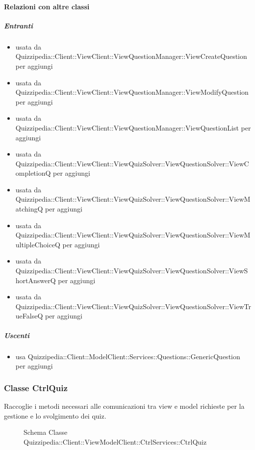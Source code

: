 \paragraph{Relazioni con altre classi}
\subparagraph{Entranti}
\begin{itemize}
\item usata da Quizzipedia::Client::ViewClient::ViewQuestionManager::ViewCreateQuestion per aggiungi
\item usata da Quizzipedia::Client::ViewClient::ViewQuestionManager::ViewModifyQuestion per aggiungi
\item usata da Quizzipedia::Client::ViewClient::ViewQuestionManager::ViewQuestionList per aggiungi
\item usata da Quizzipedia::Client::ViewClient::ViewQuizSolver::ViewQuestionSolver::ViewCompletionQ per aggiungi
\item usata da Quizzipedia::Client::ViewClient::ViewQuizSolver::ViewQuestionSolver::ViewMatchingQ per aggiungi
\item usata da Quizzipedia::Client::ViewClient::ViewQuizSolver::ViewQuestionSolver::ViewMultipleChoiceQ per aggiungi
\item usata da Quizzipedia::Client::ViewClient::ViewQuizSolver::ViewQuestionSolver::ViewShortAnswerQ per aggiungi
\item usata da Quizzipedia::Client::ViewClient::ViewQuizSolver::ViewQuestionSolver::ViewTrueFalseQ per aggiungi
\end{itemize}
\subparagraph{Uscenti}
\begin{itemize}
\item usa Quizzipedia::Client::ModelClient::Services::Questions::GenericQuestion per aggiungi
\end{itemize}
\subsubsection{Classe CtrlQuiz}
Raccoglie i metodi necessari alle comunicazioni tra view e model richieste per la gestione e lo svolgimento dei quiz.
\begin{figure}[H]
\centering
\noindent{}
\caption[Schema Classe CtrlQuiz]{Schema Classe Quizzipedia::Client::ViewModelClient::CtrlServices::CtrlQuiz}
\end{figure}
